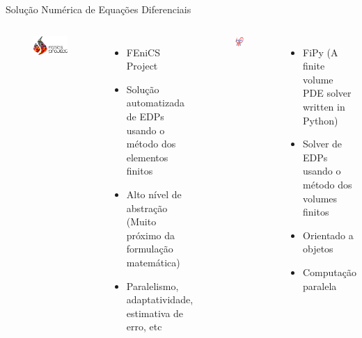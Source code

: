 \documentclass[12pt,t,graphics]{beamer}
\begin{document}
\begin{frame}[t]{Solução Numérica de Equações Diferenciais}
	\begin{columns}
		\vspace{-0.7cm}
		\begin{figure}
			\centering
			\includegraphics[scale=0.3]{img/fenics.png}
		\end{figure}
		\begin{itemize}
			\item FEniCS Project
			\item Solução automatizada de EDPs usando o método dos elementos finitos
			\item Alto nível de abstração (Muito próximo da formulação matemática)
			\item Paralelismo, adaptatividade, estimativa de erro, etc
		\end{itemize}
		\vspace{-0.75cm}
		\begin{figure}
			\centering
			\includegraphics[scale=0.65]{img/logo_fipy.png}
		\end{figure}
		\begin{itemize}
			\item FiPy (A finite volume PDE solver written in Python)
			\item Solver de EDPs usando o método dos volumes finitos
			\item Orientado a objetos
			\item Computação paralela
		\end{itemize}
	\end{columns}
	
\end{frame}
\end{document}
